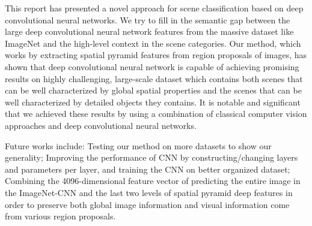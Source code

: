 
This report has presented a novel approach for scene classification based on
deep convolutional neural networks. We try to fill in the semantic gap between
the large deep convolutional neural network features from the massive dataset
like ImageNet and the high-level context in the scene categories. Our method, which
works by extracting spatial pyramid features from region proposals of images, has shown
that deep convolutional neural network is capable of achieving promising
results on highly challenging, large-scale dataset which contains both scenes
that can be well characterized by global spatial properties and the scenes that
can be well characterized by detailed objects they contains.
It is notable and significant that we achieved these results by using a
combination of classical computer vision approaches and deep convolutional
neural networks.

Future works include: Testing our method on more datasets to show our
generality; Improving the performance of CNN by constructing/changing layers and
parameters per layer, and training the CNN on better organized dataset; Combining
the 4096-dimensional feature vector of predicting the entire image in the 
ImageNet-CNN and the last two levels of spatial pyramid deep features in order
to preserve both global image information and visual information come from various
region proposals.